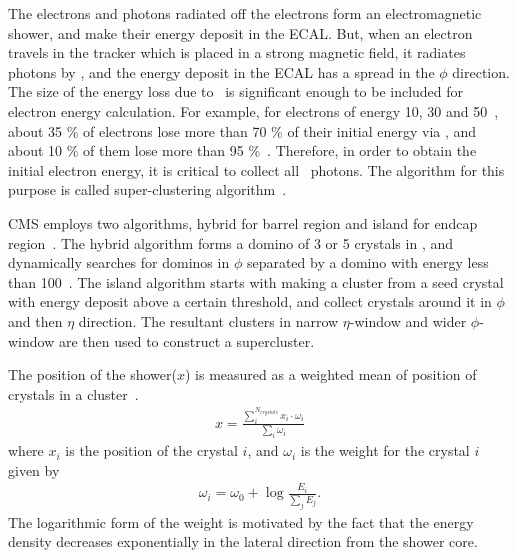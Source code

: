 The electrons and photons radiated off the electrons 
form an electromagnetic shower, and make their energy deposit in the ECAL. 
But, when an electron travels in the tracker which is placed in a strong magnetic field, 
it radiates photons by \brem, and the energy deposit 
in the ECAL has a spread in the $\phi$ direction. The size of the energy loss due to \brem\ 
is significant enough to be included for electron energy calculation. 
For example, for electrons of energy 10, 30 and 50~\GeV, about 35 \% of electrons 
lose more than 70 \% of their initial energy via \brem, and about 10 \% of them 
lose more than 95 \%~\cite{Baffioni:2006cd}. Therefore, in order to 
obtain the initial electron energy, it is critical to collect all \brem\ photons.
The algorithm for this purpose is called super-clustering algorithm~\cite{Baffioni:2006cd}.

CMS employs two algorithms, hybrid for barrel region 
and island for endcap region~\cite{Baffioni:2006cd}. 
The hybrid algorithm forms a domino of 3 or 5 crystals in \Eta, and
dynamically searches for dominos in $\phi$ separated by a domino with energy less 
than 100~\MeV.
The island algorithm starts with making a cluster from a seed crystal with energy deposit 
above a certain threshold, and collect crystals around it 
in $\phi$ and then $\eta$ direction. 
The resultant clusters in narrow $\eta$-window and wider $\phi$-window 
are then used to construct a supercluster.

The position of the shower($x$) is measured as a weighted mean of position of crystals 
in a cluster~\cite{cmstdr1}. 
\begin{eqnarray} 
x = \frac{\displaystyle \sum_i^{N_{crystals}} {x_i} \cdot \omega_i}
         {\displaystyle \sum_i \omega_i}   
\end{eqnarray}
where $x_i$ is the position of the crystal $i$, 
and $\omega_i$ is the weight for the crystal $i$ given by  
\begin{eqnarray} 
\omega_i = \omega_0 + \log{\frac{E_i}{\displaystyle \sum_j E_j}}.
\end{eqnarray} 
The logarithmic form of the weight is motivated by the fact that 
the energy density decreases exponentially in the lateral direction 
from the shower core.  

